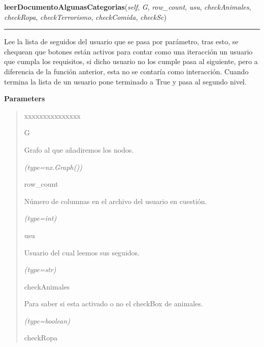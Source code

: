 \hspace{.8\funcindent}\begin{boxedminipage}{\funcwidth}

    \raggedright \textbf{leerDocumentoAlgunasCategorias}(\textit{self}, \textit{G}, \textit{row\_count}, \textit{usu}, \textit{checkAnimales}, \textit{checkRopa}, \textit{checkTerrorismo}, \textit{checkComida}, \textit{checkSc})

    \vspace{-1.5ex}

    \rule{\textwidth}{0.5\fboxrule}
\setlength{\parskip}{2ex}
    Lee la lista de seguidos del usuario que se pasa por parámetro, tras 
    esto, se chequean que botones están activos para contar como una 
    iteracción un usuario que cumpla los requisitos, si dicho usuario no 
    los cumple pasa al siguiente, pero a diferencia de la función anterior,
    esta no se contaría como interacción. Cuando termina la lista de un 
    usuario pone terminado a True y pasa al segundo nivel.

\setlength{\parskip}{1ex}
      \textbf{Parameters}
      \vspace{-1ex}

      \begin{quote}
        \begin{Ventry}{xxxxxxxxxxxxxxx}

          \item[G]

          Grafo al que añadiremos los nodos.

            {\it (type=nx.Graph())}

          \item[row\_count]

          Número de columnas en el archivo del usuario en cuestión.

            {\it (type=int)}

          \item[usu]

          Usuario del cual leemos sus seguidos.

            {\it (type=str)}

          \item[checkAnimales]

          Para saber si esta activado o no el checkBox de animales.

            {\it (type=boolean)}

          \item[checkRopa]


\end{Ventry}
\end{quote}
\end{boxedminipage}
